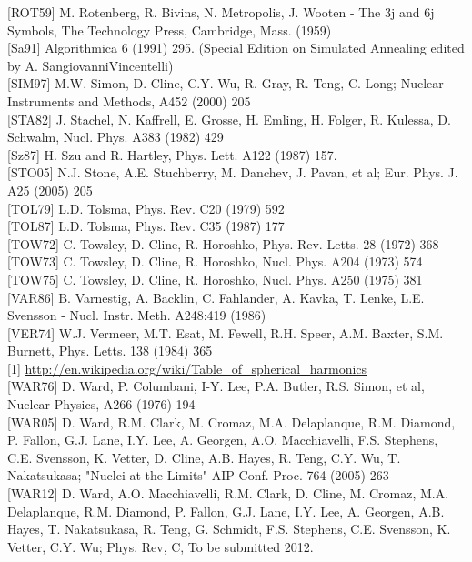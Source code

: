 \documentclass[10pt]{article}
\begin{document}
[ROT59] M. Rotenberg, R. Bivins, N. Metropolis, J. Wooten - The 3j and 6j Symbols, The Technology Press, Cambridge, Mass. (1959)\\[0pt]
[Sa91] Algorithmica 6 (1991) 295. (Special Edition on Simulated Annealing edited by A. SangiovanniVincentelli)\\[0pt]
[SIM97] M.W. Simon, D. Cline, C.Y. Wu, R. Gray, R. Teng, C. Long; Nuclear Instruments and Methods, A452 (2000) 205\\[0pt]
[STA82] J. Stachel, N. Kaffrell, E. Grosse, H. Emling, H. Folger, R. Kulessa, D. Schwalm, Nucl. Phys. A383 (1982) 429\\[0pt]
[Sz87] H. Szu and R. Hartley, Phys. Lett. A122 (1987) 157.\\[0pt]
[STO05] N.J. Stone, A.E. Stuchberry, M. Danchev, J. Pavan, et al; Eur. Phys. J. A25 (2005) 205\\[0pt]
[TOL79] L.D. Tolsma, Phys. Rev. C20 (1979) 592\\[0pt]
[TOL87] L.D. Tolsma, Phys. Rev. C35 (1987) 177\\[0pt]
[TOW72] C. Towsley, D. Cline, R. Horoshko, Phys. Rev. Letts. 28 (1972) 368\\[0pt]
[TOW73] C. Towsley, D. Cline, R. Horoshko, Nucl. Phys. A204 (1973) 574\\[0pt]
[TOW75] C. Towsley, D. Cline, R. Horoshko, Nucl. Phys. A250 (1975) 381\\[0pt]
[VAR86] B. Varnestig, A. Backlin, C. Fahlander, A. Kavka, T. Lenke, L.E. Svensson - Nucl. Instr. Meth. A248:419 (1986)\\[0pt]
[VER74] W.J. Vermeer, M.T. Esat, M. Fewell, R.H. Speer, A.M. Baxter, S.M. Burnett, Phys. Letts. 138 (1984) 365\\[0pt]
[1] \href{http://en.wikipedia.org/wiki/Table_of_spherical_harmonics}{http://en.wikipedia.org/wiki/Table\_of\_spherical\_harmonics}\\[0pt]
[WAR76] D. Ward, P. Columbani, I-Y. Lee, P.A. Butler, R.S. Simon, et al, Nuclear Physics, A266 (1976) 194\\[0pt]
[WAR05] D. Ward, R.M. Clark, M. Cromaz, M.A. Delaplanque, R.M. Diamond, P. Fallon, G.J. Lane, I.Y. Lee, A. Georgen, A.O. Macchiavelli, F.S. Stephens, C.E. Svensson, K. Vetter, D. Cline, A.B. Hayes, R. Teng, C.Y. Wu, T. Nakatsukasa; "Nuclei at the Limits" AIP Conf. Proc. 764 (2005) 263\\[0pt]
[WAR12] D. Ward, A.O. Macchiavelli, R.M. Clark, D. Cline, M. Cromaz, M.A. Delaplanque, R.M. Diamond, P. Fallon, G.J. Lane, I.Y. Lee, A. Georgen, A.B. Hayes, T. Nakatsukasa, R. Teng, G. Schmidt, F.S. Stephens, C.E. Svensson, K. Vetter, C.Y. Wu; Phys. Rev, C, To be submitted 2012.\\[0pt]
\end{document}
